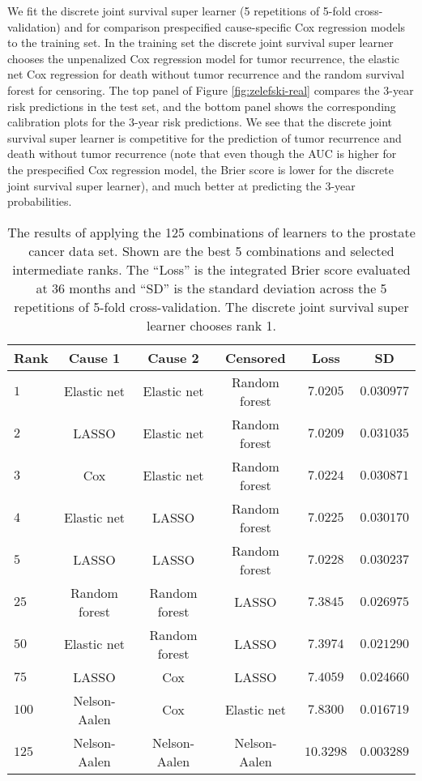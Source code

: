 \documentclass[lineno]{biometrika}
\newcommand{\1}{\mathds{1}}
\begin{document}
We fit the discrete joint survival super learner (5 repetitions of
5-fold cross-validation) and for comparison prespecified
cause-specific Cox regression models to the training set. In the
training set the discrete joint survival super learner chooses the
unpenalized Cox regression model for tumor recurrence, the elastic net
Cox regression for death without tumor recurrence and the random
survival forest for censoring. The top panel of Figure
\ref{fig:zelefski-real} compares the 3-year risk predictions in the
test set, and the bottom panel shows the corresponding calibration
plots for the 3-year risk predictions. We see that the discrete joint
survival super learner is competitive for the prediction of tumor
recurrence and death without tumor recurrence (note that even though
the AUC is higher for the prespecified Cox regression model, the Brier
score is lower for the discrete joint survival super learner), and
much better at predicting the 3-year probabilities.

\begin{table}[h]
  \caption{The results of applying the 125 combinations of learners to
the prostate cancer data set. Shown are the best 5 combinations and
selected intermediate ranks.  The ``Loss'' is the integrated Brier
score evaluated at 36 months and ``SD'' is the standard deviation
across the 5 repetitions of 5-fold cross-validation. The discrete
joint survival super learner chooses rank 1. }
\begin{center} 
\begin{tabular}{ l| c c c c c } 
 Rank&Cause 1&Cause 2&Censored&Loss&SD \\\hline
 $   1 $&Elastic net&Elastic net&Random forest&$  7.0205 $&$ 0.030977 $ \\
 $   2 $&LASSO&Elastic net&Random forest&$  7.0209 $&$ 0.031035 $ \\
 $   3 $&Cox&Elastic net&Random forest&$  7.0224 $&$ 0.030871 $ \\
 $   4 $&Elastic net&LASSO&Random forest&$  7.0225 $&$ 0.030170 $ \\
 $   5 $&LASSO&LASSO&Random forest&$  7.0228 $&$ 0.030237 $ \\
 $  25 $&Random forest&Random forest&LASSO&$  7.3845 $&$ 0.026975 $ \\
 $  50 $&Elastic net&Random forest&LASSO&$  7.3974 $&$ 0.021290 $ \\
 $  75 $&LASSO&Cox&LASSO&$  7.4059 $&$ 0.024660 $ \\
 $ 100 $&Nelson-Aalen&Cox&Elastic net&$  7.8300 $&$ 0.016719 $ \\
 $ 125 $&Nelson-Aalen&Nelson-Aalen&Nelson-Aalen&$ 10.3298 $&$ 0.003289 $ \\
\end{tabular}\label{tab:1}
\end{center}
\end{table}
\end{document}
